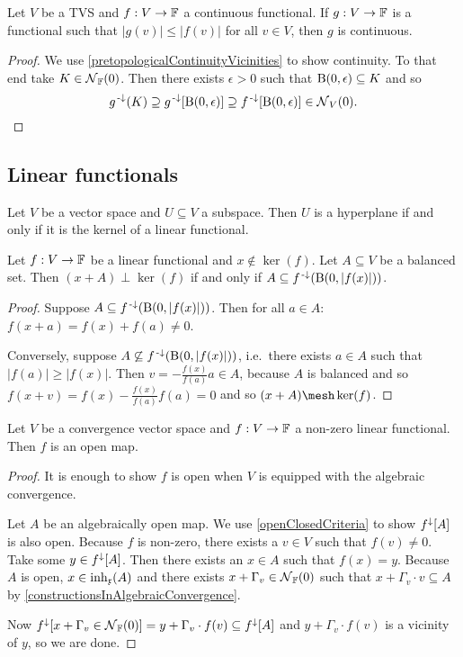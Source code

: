 \begin{lemma} \label{continuityDominatedFunctional}
Let $V$ be a TVS and $f:V\to \mathbb{F}$ a continuous functional. If $g:V\to \mathbb{F}$ is a functional such that $|g(v)|\leq |f(v)|$ for all $v\in V$, then $g$ is continuous.
\end{lemma}
\begin{proof}
We use \ref{pretopologicalContinuityVicinities} to show continuity. To that end take $K\in \operatorname{\mathcal{N}}_{\mathbb{F}}(0)$. Then there exists $\epsilon >0$ such that $\operatorname{B}(0,\epsilon)\subseteq K$ and so
\[ g^{{\text{\hspace{0.15em}-}\downarrow}}(K) \supseteq g^{\text{\hspace{0.15em}-}\downarrow}[\operatorname{B}(0,\epsilon)] \supseteq f^{\text{\hspace{0.15em}-}\downarrow}[\operatorname{B}(0,\epsilon)] \in \operatorname{\mathcal{N}}_V(0). \]
\end{proof}

\subsection{Linear functionals}
\begin{lemma} \label{kernelHyperplane}
Let $V$ be a vector space and $U\subseteq V$ a subspace. Then $U$ is a hyperplane \textup{if and only if} it is the kernel of a linear functional.
\end{lemma}

\begin{lemma} \label{functionalBoundedNeighbourhood}
Let $f: V\to \mathbb{F}$ be a linear functional and $x\notin \ker(f)$. Let $A\subseteq V$ be a balanced set. Then $(x+A)\perp \ker(f)$ \textup{if and only if} $A \subseteq f^{{\text{\hspace{0.15em}-}\downarrow}}(\operatorname{B}(0,|f(x)|))$.
\end{lemma}
\begin{proof}
Suppose $A \subseteq f^{{\text{\hspace{0.15em}-}\downarrow}}(\operatorname{B}(0,|f(x)|))$. Then for all $a\in A$: $f(x+a) = f(x) + f(a) \neq 0$.

Conversely, suppose $A \not\subseteq f^{{\text{\hspace{0.15em}-}\downarrow}}(\operatorname{B}(0,|f(x)|))$, i.e.\ there exists $a\in A$ such that $|f(a)| \geq |f(x)|$. Then $v= -\frac{f(x)}{f(a)}a\in A$, because $A$ is balanced and so $f(x+ v) = f(x)-\frac{f(x)}{f(a)}f(a) = 0$ and so $(x+A) \mesh \ker(f)$.
\end{proof}

\begin{proposition} \label{linearFunctionalOpen}
Let $V$ be a convergence vector space and $f:V\to \mathbb{F}$ a non-zero linear functional. Then $f$ is an open map.
\end{proposition}
\begin{proof}
It is enough to show $f$ is open when $V$ is equipped with the algebraic convergence.

Let $A$ be an algebraically open map. We use \ref{openClosedCriteria} to show $f^\downarrow[A]$ is also open. Because $f$ is non-zero, there exists a $v\in V$ such that $f(v) \neq 0$. Take some $y\in f^\downarrow[A]$. Then there exists an $x\in A$ such that $f(x) = y$. Because $A$ is open, $x\in \operatorname{inh}_\mathfrak{x}(A)$ and there exists $x+ \Gamma_v\in \operatorname{\mathcal{N}}_{\mathbb{F}}(0)$ such that $x+\Gamma_v\cdot v \subseteq A$ by \ref{constructionsInAlgebraicConvergence}.

Now $f^\downarrow[x+ \Gamma_v\in \operatorname{\mathcal{N}}_{\mathbb{F}}(0)] = y+\Gamma_v \cdot f(v) \subseteq f^\downarrow[A]$ and $y+\Gamma_v \cdot f(v)$ is a vicinity of $y$, so we are done.
\end{proof}

